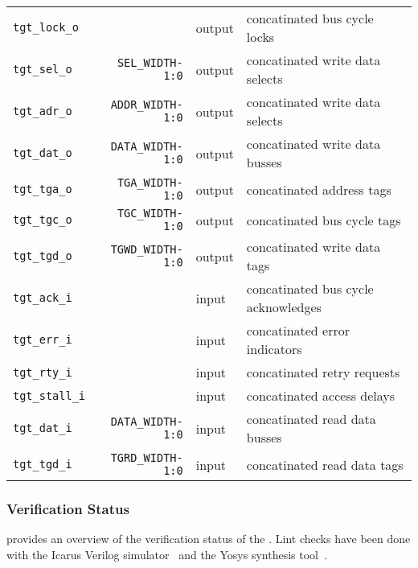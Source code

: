 \begin{center}
\begin{longtable}{|l|r|l|l|}
    \texttt{tgt\_lock\_o}        &                          & output & concatinated bus cycle locks	     \\
    \texttt{tgt\_sel\_o}         & \texttt{SEL\_WIDTH-1:0}  & output & concatinated write data selects	     \\
    \texttt{tgt\_adr\_o}         & \texttt{ADDR\_WIDTH-1:0} & output & concatinated write data selects	     \\
    \texttt{tgt\_dat\_o}         & \texttt{DATA\_WIDTH-1:0} & output & concatinated write data busses	     \\
    \texttt{tgt\_tga\_o}         & \texttt{TGA\_WIDTH-1:0}  & output & concatinated address tags	     \\
    \texttt{tgt\_tgc\_o}         & \texttt{TGC\_WIDTH-1:0}  & output & concatinated bus cycle tags	     \\
    \texttt{tgt\_tgd\_o}         & \texttt{TGWD\_WIDTH-1:0} & output & concatinated write data tags	     \\
    \texttt{tgt\_ack\_i}         &                          & input  & concatinated bus cycle acknowledges   \\
    \texttt{tgt\_err\_i}         &                          & input  & concatinated error indicators	     \\
    \texttt{tgt\_rty\_i}         &                          & input  & concatinated retry requests	     \\
    \texttt{tgt\_stall\_i}       &                          & input  & concatinated access delays	     \\
    \texttt{tgt\_dat\_i}         & \texttt{DATA\_WIDTH-1:0} & input  & concatinated read data busses	     \\
    \texttt{tgt\_tgd\_i}         & \texttt{TGRD\_WIDTH-1:0} & input  & concatinated read data tags           \\   
  \end{longtable}
\end{center}  

\subsubsection{Verification Status}
\label{split:verif}

 provides an overview of the verification status of the .
Lint checks have been done with the Icarus Verilog simulator~\cite{iverilog} and the Yosys synthesis tool~\cite{yosys}.

